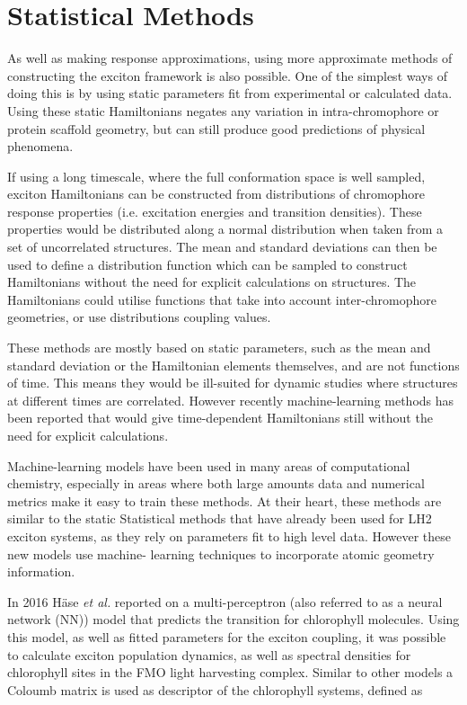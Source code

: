\section{Statistical Methods}
\label{sec:stats_methods}

As well as making response approximations, using more approximate methods of constructing 
the exciton framework is also possible. One of the simplest ways of doing this is
by using static parameters fit from experimental or calculated data. Using these
static Hamiltonians negates any variation in intra-chromophore or protein scaffold 
geometry, but can still produce good predictions of physical phenomena.

If using a long timescale, where the full conformation space is well sampled, exciton
Hamiltonians can be constructed from distributions of chromophore response properties
(i.e. excitation energies and transition densities). These properties would be distributed
along a normal distribution when taken from a set of uncorrelated structures. The
mean and standard deviations can then be used to define a distribution function 
which can be sampled to construct Hamiltonians without the need for explicit calculations
on structures. The Hamiltonians could utilise functions that take into account inter-chromophore
geometries, or use distributions coupling values.

These methods are mostly based on static parameters, such as the mean and standard
deviation or the Hamiltonian elements themselves, and are not functions of time.
This means they would be ill-suited for dynamic studies where structures at different
times are correlated. However recently machine-learning methods has been reported
that would give time-dependent Hamiltonians still without the need for explicit
calculations.

Machine-learning models have been used in many areas of computational chemistry,
especially in areas where both large amounts data and numerical metrics make it 
easy to train these methods. At their heart, these methods are similar to the static
Statistical methods that have already been used for LH2 exciton systems, as they
rely on parameters fit to high level data. However these new models use machine-
learning techniques to incorporate atomic geometry information.

In 2016 H\"{a}se \emph{et al.} reported on a multi-perceptron (also referred to
as a neural network (NN)) model that predicts the \Qy transition for chlorophyll
molecules. Using this model, as well as fitted parameters for the exciton coupling,
it was possible to calculate exciton population dynamics, as well as spectral densities
for chlorophyll sites in the FMO light harvesting complex. Similar to other models
a Coloumb matrix is used as descriptor of the chlorophyll systems, defined as 

